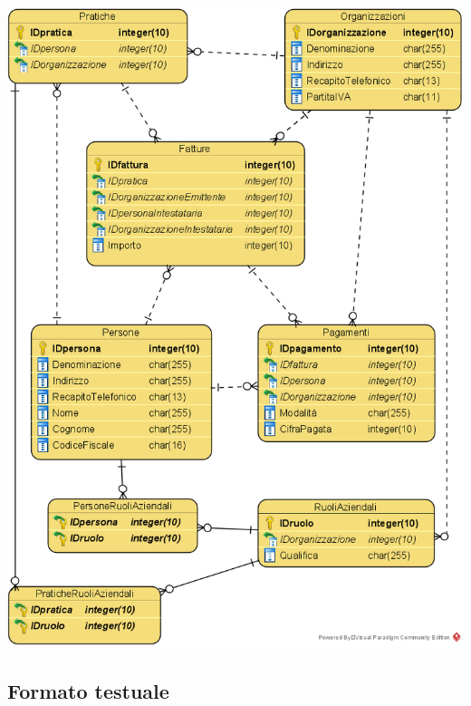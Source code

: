 \documentclass[a4paper,12pt]{article}
\begin{document}
\begin{minipage}{\textwidth}
\begin{center}
\centering 
\centerline{
\includegraphics[width=\textwidth -4cm]{ Schema logico relazionale.png }
}
\end{center}
\end{minipage}

 \subsection{ Formato testuale }
\end{document}
